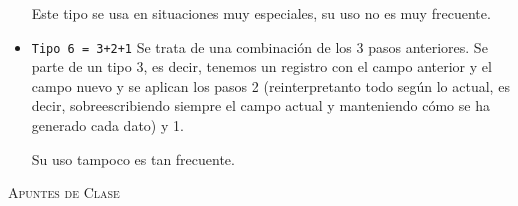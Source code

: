 \begin{itemize}
		
		Este tipo se usa en situaciones muy especiales, su uso no es muy frecuente.
		
		
		\item \texttt{Tipo 6 = 3+2+1} Se trata de una combinación de los 3 pasos anteriores. Se parte de un tipo 3, es decir, tenemos un registro con el campo anterior y el campo nuevo y se aplican los pasos 2 (reinterpretanto todo según lo actual, es decir, sobreescribiendo siempre el campo actual y manteniendo cómo se ha generado cada dato) y 1.
		
		Su uso tampoco es tan frecuente.
		
	\end{itemize}
	
	
	
	
	
	
	
	
	
	
	
	
	\newpage
	\begin{thebibliography}{X}
		
		 \textsc{Apuntes de Clase}
		
	\end{thebibliography}
	
	



